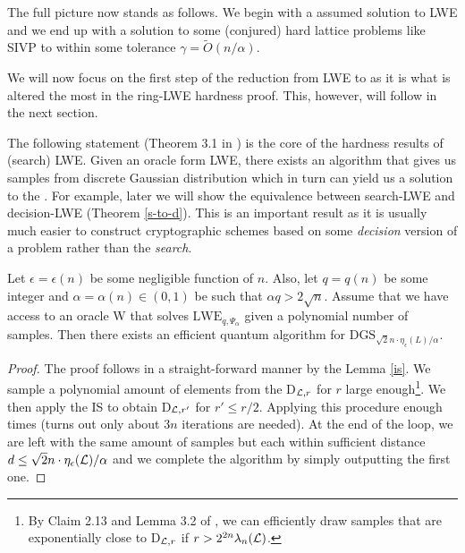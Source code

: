 The full picture now stands as follows. We begin with a assumed solution to LWE and we end up with a solution to some (conjured) hard lattice problems like SIVP to within some tolerance $\gamma = \tilde{O}(n/\alpha)$.

\begin{center}
\end{center}
We will now focus on the first step of the reduction from LWE to  as it is what is altered the most in the ring-LWE hardness proof. This, however, will follow in the next section.

The following statement (Theorem 3.1 in \cite{regev}) is the core of the hardness results of (search) LWE. Given an oracle form LWE, there exists an algorithm that gives us samples from discrete Gaussian distribution which in turn can yield us a solution to the . For example, later we will show the equivalence between search-LWE and decision-LWE (Theorem \ref{s-to-d}). This is an important result as it is usually much easier to construct cryptographic schemes based on some \textit{decision} version of a problem rather than the \textit{search}.

\begin{theorem}\label{heart}
	Let $\epsilon = \epsilon(n)$ be some negligible function of $n$. Also, let $q = q(n)$ be some integer and $\alpha = \alpha(n) \in (0, 1)$ be such that $\alpha q > 2\sqrt{n}$. Assume that we have access to an oracle W that solves $\text{LWE}_{q,\Psi_{\alpha}}$ given a polynomial number of samples. Then there exists an efficient quantum algorithm for $\text{DGS}_{\sqrt{2}n \cdot \eta_{\epsilon}(L)/\alpha}$.
\end{theorem}
\begin{proof}
	The proof follows in a straight-forward manner by the Lemma \ref{is}. We sample a polynomial amount of elements from the D$_{\mathcal{L}, r}$ for $r$ large enough\footnote{By Claim 2.13 and Lemma 3.2 of \cite{regev}, we can efficiently draw samples that are exponentially close to D$_{\mathcal{L}, r}$ if $r > 2^{2n} \lambda_n(\mathcal{L})$.}. We then apply the IS to obtain D$_{\mathcal{L}, r'}$ for $r' \leq r/2$. Applying this procedure enough times (turns out only about $3n$ iterations are needed). At the end of the loop, we are left with the same amount of samples but each within sufficient distance $d \leq \sqrt{2}n \cdot \eta_{\epsilon}(\mathcal{L})/\alpha$ and we complete the algorithm by simply outputting the first one.
\end{proof}


